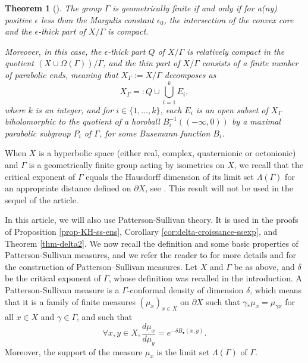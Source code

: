 \documentclass{article}
\newtheorem*{theorem*}{Theorem}
\theoremstyle{definition}
\theoremstyle{remark}
\begin{document}
\begin{theorem*}[{\cite[Definition F1]{bowditchGeometricalFinitenessVariable1995}}]
	The group $\Gamma$ is geometrically finite if and only if for a(ny) positive $\epsilon$ less than the Margulis constant $\epsilon_0$, the intersection of the convex core and the $\epsilon$-thick part of $X/\Gamma$ is compact.
	
	Moreover, in this case, the $\epsilon$-thick part $Q$ of $X/\Gamma$ is relatively compact in the quotient $\left(X\cup \Omega(\Gamma)\right)/\Gamma$, and the thin part of $X/\Gamma$ consists of a finite number of parabolic ends, meaning that $X_{\Gamma}:=X/\Gamma$ decomposes as 
	\begin{equation}\label{eq-decompo-GF}
		X_{\Gamma} =: Q \cup \bigcup_{i=1}^{k}E_i,
	\end{equation}
	where $k$ is an integer, and for $i\in \{1,\dots,k\}$, each $E_i$ is an open subset of $X_{\Gamma}$ biholomorphic to the quotient of a horoball $B_i^{-1}((-\infty,0))$ by a maximal parabolic subgroup $P_i$ of $\Gamma$, for some Busemann function $B_i$.
\end{theorem*}
When $X$ is a hyperbolic space (either real, complex, quaternionic or octonionic) and $\Gamma$ is a geometrically finite group acting by isometries on $X$, we recall that the critical exponent of $\Gamma$ equals the Hausdorff dimension of its limit set $\Lambda(\Gamma)$ for an appropriate distance defined on $\partial X$, see \cite[Theorem 6.1]{corletteLimitSetsDiscrete1999}. This result will not be used in the sequel of the article.


In this article, we will also use Patterson-Sullivan theory. It is used in the proofs of Proposition \ref{prop-KH-ss-ens}, Corollary \ref{cor:delta-croissance-ssexp}, and Theorem \ref{thm-delta2}. We now recall the definition and some basic properties of Patterson-Sullivan measures, and we refer the reader to \cite{roblinErgodiciteEquidistributionCourbure2003,pattersonLimitSetFuchsian1976, sullivanDensityInfinityDiscrete1979, nichollsErgodicTheoryDiscrete1989} for more details and for the construction of Patterson--Sullivan measures. Let $X$ and $\Gamma$ be as above, and $\delta$ be the critical exponent of $\Gamma$, whose definition was recalled in the introduction. A Patterson-Sullivan measure is a $\Gamma$-conformal density of dimension $\delta$, which means that it is a family of finite measures $(\mu_x)_{x\in X}$ on $\partial X$ such that $\gamma_*\mu_x = \mu_{\gamma x}$ for all $x\in X$ and $\gamma\in \Gamma$, and such that
		\begin{equation}\label{eq-prop-PS} \forall x,y\in X, \frac{d\mu_x}{d\mu_y}=e^{-\delta B_{\bullet}(x,y)}. \end{equation} 
		Moreover, the support of the measure $\mu_x$ is the limit set $\Lambda(\Gamma)$ of $\Gamma$.
\end{document}
